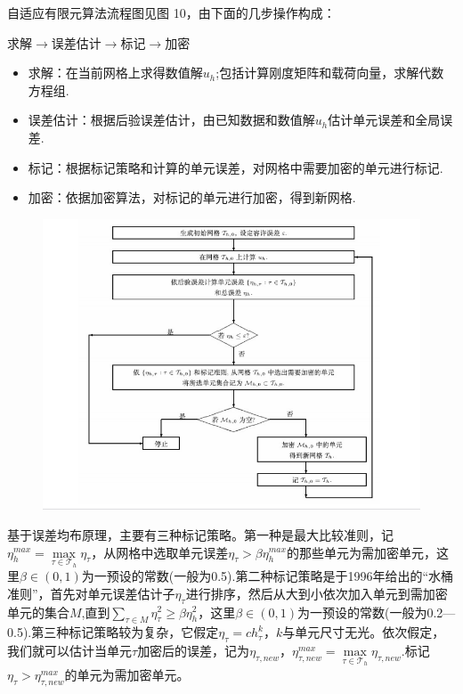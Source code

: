 \documentclass{article}
\begin{document}
自适应有限元算法流程图见图 10，由下面的几步操作构成：
\begin{center}
求解$\rightarrow$误差估计$\rightarrow$标记$\rightarrow$加密
\end{center}
\begin{itemize} 
\item 求解：在当前网格上求得数值解$u_h$;包括计算刚度矩阵和载荷向量，求解代数方程组.
\item 误差估计：根据后验误差估计，由已知数据和数值解$u_h$估计单元误差和全局误差.
\item 标记：根据标记策略和计算的单元误差，对网格中需要加密的单元进行标记.
\item 加密：依据加密算法，对标记的单元进行加密，得到新网格.
\end{itemize}
\begin{figure}[H]
\centering
\includegraphics[scale=0.6]{./figures/Figure_13.png}
\caption{}
\end{figure}
基于误差均布原理，主要有三种标记策略。第一种是最大比较准则，记$\eta_h^{max}=\max\limits_{\tau\in\mathcal{T}_h}\eta_{\tau}$，从网格中选取单元误差$\eta_{\tau}>\beta\eta_h^{max}$的那些单元为需加密单元，这里$\beta\in(0,1)$为一预设的常数(一般为0.5).第二种标记策略是于1996年给出的“水桶准则”，首先对单元误差估计子$\eta_{\tau}$进行排序，然后从大到小依次加入单元到需加密单元的集合$M$,直到$\sum\limits_{\tau\in M}\eta_{\tau}^2\ge\beta\eta_h^2$，这里$\beta\in(0,1)$为一预设的常数(一般为0.2—0.5).第三种标记策略较为复杂，它假定$\eta_{\tau}=ch_{\tau}^k$，$k$与单元尺寸无光。依次假定，我们就可以估计当单元$\tau$加密后的误差，记为$\eta_{\tau,new}$，$\eta_{\tau,new}^{max}=\max\limits_{\tau\in\mathcal{T}_h}\eta_{\tau,new}$.标记$\eta_{\tau}>\eta_{\tau,new}^{max}$的单元为需加密单元。
\end{document}
